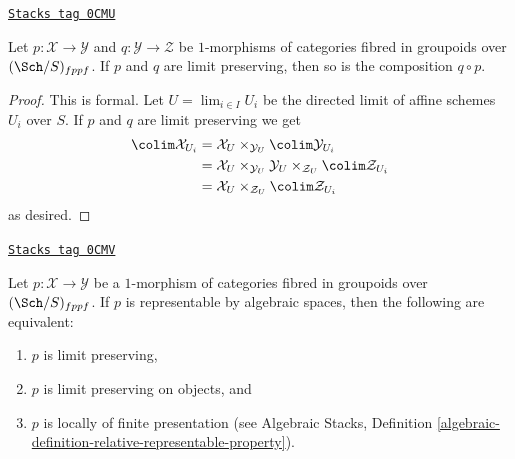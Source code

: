 \begin{lemma}
\label{stacks-limits-lemma-composition-limit-preserving}
\href{https://stacks.math.columbia.edu/tag/0CMU}{\texttt{Stacks tag 0CMU}}

Let $p : \mathcal{X} \to \mathcal{Y}$ and $q : \mathcal{Y} \to \mathcal{Z}$
be $1$-morphisms of categories fibred in groupoids over $(\Sch/S)_{fppf}$.
If $p$ and $q$ are limit preserving, then so is the composition $q \circ p$.
\end{lemma}

\begin{proof}
This is formal. Let $U = \lim_{i \in I} U_i$ be the directed limit
of affine schemes $U_i$ over $S$. If $p$ and $q$ are limit preserving we get
\begin{align*}
\colim \mathcal{X}_{U_i}
& =
\mathcal{X}_U \times_{\mathcal{Y}_U} \colim \mathcal{Y}_{U_i} \\
& =
\mathcal{X}_U \times_{\mathcal{Y}_U} \mathcal{Y}_U
\times_{\mathcal{Z}_U} \colim \mathcal{Z}_{U_i} \\
& =
\mathcal{X}_U \times_{\mathcal{Z}_U} \colim \mathcal{Z}_{U_i}
\end{align*}
as desired.
\end{proof}

\begin{lemma}
\label{stacks-limits-lemma-representable-by-spaces-limit-preserving}
\href{https://stacks.math.columbia.edu/tag/0CMV}{\texttt{Stacks tag 0CMV}}

Let $p : \mathcal{X} \to \mathcal{Y}$ be a $1$-morphism of categories
fibred in groupoids over $(\Sch/S)_{fppf}$. If $p$ is
representable by algebraic spaces, then the following are equivalent:
\begin{enumerate}
\item $p$ is limit preserving,
\item $p$ is limit preserving on objects, and
\item $p$ is locally of finite presentation (see
Algebraic Stacks,
Definition \ref{algebraic-definition-relative-representable-property}).
\end{enumerate}
\end{lemma}


